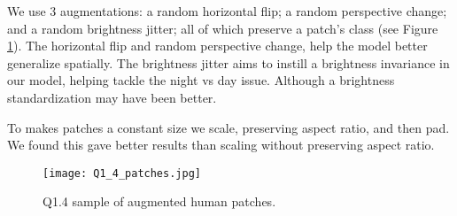 We use 3 augmentations: a random horizontal flip; a random perspective change; and a random brightness jitter; all of which preserve a patch's class (see Figure \ref{fig:Q1_4}).
The horizontal flip and random perspective change, help the model better generalize spatially.
The brightness jitter aims to instill a brightness invariance in our model, helping tackle the night vs day issue.
Although a brightness standardization may have been better.

To makes patches a constant size we scale, preserving aspect ratio, and then pad.
We found this gave better results than scaling without preserving aspect ratio.

\begin{figure}[h!]
  \begin{center}
  \texttt{[image: Q1\_4\_patches.jpg]}
    \caption{Q1.4 sample of augmented human patches.}
    \label{fig:Q1_4}
  \end{center}
  \end{figure}